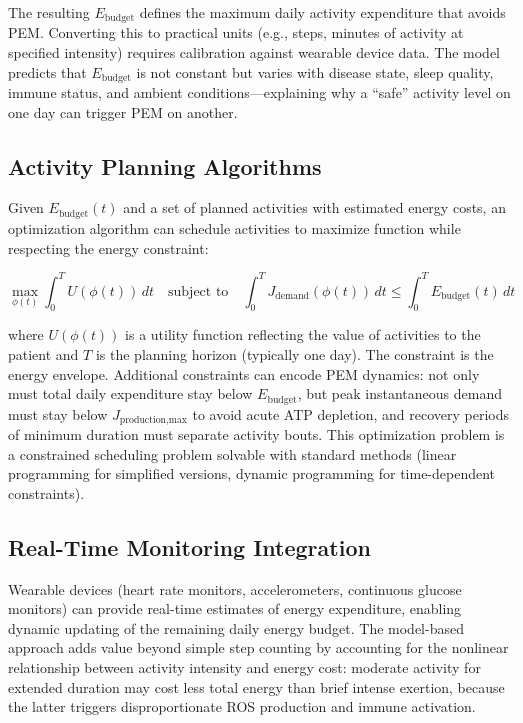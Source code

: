 The resulting $E_{\text{budget}}$ defines the maximum daily activity expenditure that avoids PEM. Converting this to practical units (e.g., steps, minutes of activity at specified intensity) requires calibration against wearable device data. The model predicts that $E_{\text{budget}}$ is not constant but varies with disease state, sleep quality, immune status, and ambient conditions---explaining why a ``safe'' activity level on one day can trigger PEM on another.

\subsection{Activity Planning Algorithms}

Given $E_{\text{budget}}(t)$ and a set of planned activities with estimated energy costs, an optimization algorithm can schedule activities to maximize function while respecting the energy constraint:

\begin{equation}
\label{eq:pacing-optimization}
\max_{\phi(t)} \int_0^{T} U(\phi(t)) \, dt \quad \text{subject to} \quad \int_0^{T} J_{\text{demand}}(\phi(t)) \, dt \leq \int_0^{T} E_{\text{budget}}(t) \, dt
\end{equation}

where $U(\phi(t))$ is a utility function reflecting the value of activities to the patient and $T$ is the planning horizon (typically one day). The constraint is the energy envelope. Additional constraints can encode PEM dynamics: not only must total daily expenditure stay below $E_{\text{budget}}$, but peak instantaneous demand must stay below $J_{\text{production,max}}$ to avoid acute ATP depletion, and recovery periods of minimum duration must separate activity bouts. This optimization problem is a constrained scheduling problem solvable with standard methods (linear programming for simplified versions, dynamic programming for time-dependent constraints).

\subsection{Real-Time Monitoring Integration}

Wearable devices (heart rate monitors, accelerometers, continuous glucose monitors) can provide real-time estimates of energy expenditure, enabling dynamic updating of the remaining daily energy budget. The model-based approach adds value beyond simple step counting by accounting for the nonlinear relationship between activity intensity and energy cost: moderate activity for extended duration may cost less total energy than brief intense exertion, because the latter triggers disproportionate ROS production and immune activation.

